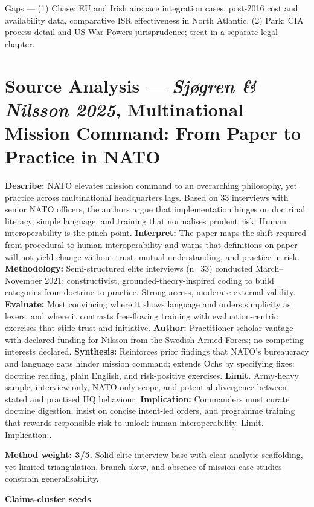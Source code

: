 Gaps — (1) Chase: EU and Irish airspace integration cases, post-2016 cost and availability data, comparative ISR effectiveness in North Atlantic. (2) Park: CIA process detail and US War Powers jurisprudence; treat in a separate legal chapter.

\parencite{SJOGREN_2025}
\section*{Source Analysis — \textit{Sjøgren & Nilsson 2025}, Multinational Mission Command: From Paper to Practice in NATO}
\textbf{Describe:} NATO elevates mission command to an overarching philosophy, yet practice across multinational headquarters lags. Based on 33 interviews with senior NATO officers, the authors argue that implementation hinges on doctrinal literacy, simple language, and training that normalises prudent risk. Human interoperability is the pinch point.
\textbf{Interpret:} The paper maps the shift required from procedural to human interoperability and warns that definitions on paper will not yield change without trust, mutual understanding, and practice in risk.
\textbf{Methodology:} Semi-structured elite interviews (n=33) conducted March–November 2021; constructivist, grounded-theory-inspired coding to build categories from doctrine to practice. Strong access, moderate external validity.
\textbf{Evaluate:} Most convincing where it shows language and orders simplicity as levers, and where it contrasts free-flowing training with evaluation-centric exercises that stifle trust and initiative.
\textbf{Author:} Practitioner-scholar vantage with declared funding for Nilsson from the Swedish Armed Forces; no competing interests declared.
\textbf{Synthesis:} Reinforces prior findings that NATO’s bureaucracy and language gaps hinder mission command; extends Ochs by specifying fixes: doctrine reading, plain English, and risk-positive exercises.
\textbf{Limit.} Army-heavy sample, interview-only, NATO-only scope, and potential divergence between stated and practised HQ behaviour.
\textbf{Implication:} Commanders must curate doctrine digestion, insist on concise intent-led orders, and programme training that rewards responsible risk to unlock human interoperability. Limit. Implication:.

\textbf{Method weight: 3/5.} Solid elite-interview base with clear analytic scaffolding, yet limited triangulation, branch skew, and absence of mission case studies constrain generalisability.

\textbf{Claims-cluster seeds}

